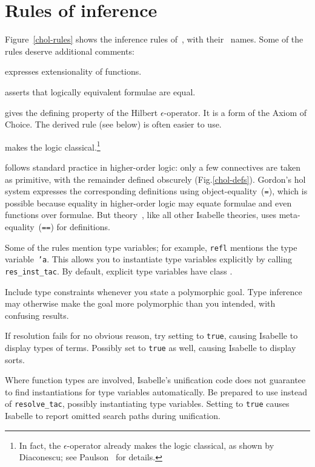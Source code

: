 \section{Rules of inference}
Figure~\ref{chol-rules} shows the inference rules of~\CHOL{}, with
their~{\ML} names.  Some of the rules deserve additional comments:
\begin{ttdescription}
\item[\tdx{ext}] expresses extensionality of functions.
\item[\tdx{iff}] asserts that logically equivalent formulae are
  equal.
\item[\tdx{selectI}] gives the defining property of the Hilbert
  $\epsilon$-operator.  It is a form of the Axiom of Choice.  The derived rule
   (see below) is often easier to use.
\item[\tdx{True_or_False}] makes the logic classical.\footnote{In
    fact, the $\epsilon$-operator already makes the logic classical, as
    shown by Diaconescu; see Paulson~\cite{paulson-COLOG} for details.}
\end{ttdescription}

\CHOL{} follows standard practice in higher-order logic: only a few
connectives are taken as primitive, with the remainder defined obscurely
(Fig.\ts\ref{chol-defs}).  Gordon's {\sc hol} system expresses the
corresponding definitions \cite[page~270]{mgordon-hol} using
object-equality~({\tt=}), which is possible because equality in
higher-order logic may equate formulae and even functions over formulae.
But theory~\CHOL{}, like all other Isabelle theories, uses
meta-equality~({\tt==}) for definitions.

Some of the rules mention type variables; for example, {\tt refl}
mentions the type variable~{\tt'a}.  This allows you to instantiate
type variables explicitly by calling {\tt res_inst_tac}.  By default,
explicit type variables have class .

Include type constraints whenever you state a polymorphic goal.  Type
inference may otherwise make the goal more polymorphic than you intended,
with confusing results.

\begin{warn}
  If resolution fails for no obvious reason, try setting
   to {\tt true}, causing Isabelle to display types of
  terms.  Possibly set  to {\tt true} as well, causing
  Isabelle to display sorts.

  Where function types are involved, Isabelle's unification code does not
  guarantee to find instantiations for type variables automatically.  Be
  prepared to use  instead of {\tt resolve_tac},
  possibly instantiating type variables.  Setting
   to {\tt true} causes Isabelle to report
  omitted search paths during unification.
\end{warn}


